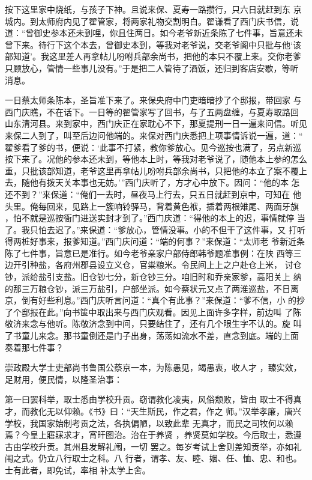 按下这里家中烧纸，与孩子下神。且说来保、夏寿一路攒行，只六日就赶到东
京城内。到太师府内见了翟管家，将两家礼物交割明白。翟谦看了西门庆书信，说
道：“曾御史参本还未到哩，你且住两日。如今老爷新近条陈了七件事，旨意还未
曾下来。待行下这个本去，曾御史本到，等我对老爷说，交老爷阁中只批与他‘该
部知道’。我这里差人再拿帖儿吩咐兵部余尚书，把他的本只不覆上来。交你老爹
只顾放心，管情一些事儿没有。”于是把二人管待了酒饭，还归到客店安歇，等听
消息。

一日蔡太师条陈本，圣旨准下来了。来保央府中门吏暗暗抄了个邸报，带回家
与西门庆瞧，不在话下。一日等的翟管家写了回书，与了五两盘缠，与夏寿取路回
山东清河县。来到家中，西门庆正在家耽心不下，那夏提刑一日一遍来问信。听见
来保二人到了，叫至后边问他端的。来保对西门庆悉把上项事情诉说一遍，道：“
翟爹看了爹的书，便说：‘此事不打紧，教你爹放心。见今巡按也满了，另点新巡
按下来了。况他的参本还未到，等他本上时，等我对老爷说了，随他本上参的怎么
重，只批该部知道，老爷这里再拿帖儿吩咐兵部余尚书，只把他的本立了案不覆上
去，随他有拨天关本事也无妨。’”西门庆听了，方才心中放下。因问：“他的本
怎还不到？”来保道：“俺们一去时，昼夜马上行去，只五日就赶到京中，可知在
他头里。俺每回来，见路上一簇响铃驿马，背着黄色袱，插着两根雉尾、两面牙旗
，怕不就是巡按衙门进送实封才到了。”西门庆道：“得他的本上的迟，事情就停
当了。我只怕去迟了。”来保道：“爹放心，管情没事。小的不但干了这件事，又
打听得两桩好事来，报爹知道。”西门庆问道：“端的何事？”来保道：“太师老
爷新近条陈了七件事，旨意已是准行。如今老爷亲家户部侍郎韩爷题准事例：在陕
西等三边开引种盐，各府州郡县设立义仓，官粜粮米。令民间上上之户赴仓上米，
讨仓钞，派给盐引支盐。旧仓钞七分，新仓钞三分。咱旧时和乔亲家爹，高阳关上
纳的那三万粮仓钞，派三万盐引，户部坐派。如今蔡状元又点了两淮巡盐，不日离
京，倒有好些利息。”西门庆听言问道：“真个有此事？”来保道：“爹不信，小
的抄了个邸报在此。”向书箧中取出来与西门庆观看。因见上面许多字样，前边叫
了陈敬济来念与他听。陈敬济念到中间，只要结住了，还有几个眼生字不认的。旋
叫了书童儿来念。那书童倒还是门子出身，荡荡如流水不差，直念到底。端的上面
奏着那七件事？

崇政殿大学士吏部尚书鲁国公蔡京一本，为陈愚见，竭愚衷，收人才
，臻实效，足财用，便民情，以隆圣治事：

第一曰罢科举，取士悉由学校升贡。窃谓教化凌夷，风俗颓败，皆由
取士不得真才，而教化无以仰赖。《书》曰：“天生斯民，作之君，作之
师。”汉举孝廉，唐兴学校，我国家始制考贡之法，各执偏陋，以致此辈
无真才，而民之司牧何以赖焉？今皇上寤寐求才，宵旰图治。治在于养贤
，养贤莫如学校。今后取士，悉遵古由学校升贡。其州县发解礼闱，一切
罢之。每岁考试上舍则差知贡举，亦如礼闱之式。仍立八行取士之科。八
行者，谓孝、友、睦、姻、任、恤、忠、和也。士有此者，即免试，率相
补太学上舍。

